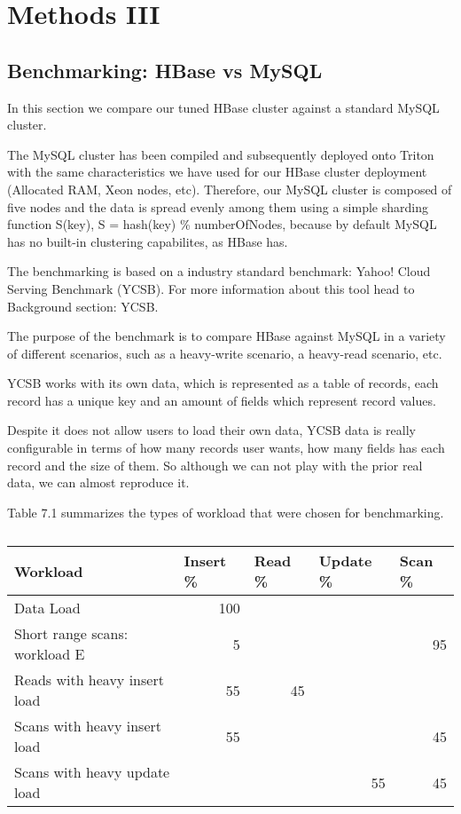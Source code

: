 \chapter{Methods III}
\label{chapter:methods III}
 
\section{Benchmarking: HBase vs MySQL}

In this section we compare our tuned HBase cluster against a standard MySQL cluster.
\par
The MySQL cluster has been compiled and subsequently deployed onto Triton with the same characteristics we have used for our HBase cluster deployment (Allocated RAM, Xeon nodes, etc). Therefore, our MySQL cluster is composed of five nodes and the data is spread evenly among them using a simple sharding function S(key), S = hash(key) \% numberOfNodes, because by default MySQL has no built-in clustering capabilites, as HBase has.

\bigskip

The benchmarking is based on a industry standard benchmark: Yahoo! Cloud Serving Benchmark (YCSB). For more information about this tool head to Background section: YCSB.
\par
The purpose of the benchmark is to compare HBase against MySQL in a variety of different scenarios, such as a heavy-write scenario, a heavy-read scenario, etc.
\par
YCSB works with its own data, which is represented as a table of records, each record has a unique key and an amount of fields which represent record values.
\par
Despite it does not allow users to load their own data, YCSB data is really configurable in terms of how many records user wants, how many fields has each record and the size of them. So although we can not play with the prior real data, we can almost reproduce it.

Table 7.1 summarizes the types of workload that were chosen for benchmarking.

\begin{table}[htbp]
\caption{}
\begin{tabular}{|l|r|l|l|l|}
\hline
Workload & \multicolumn{1}{l|}{ Insert \% } & Read \%  & Update \%  & Scan \% \\ \hline
Data Load  & 100 &  &  &  \\ \hline
Short range scans: workload E  & 5 &  &  & \multicolumn{1}{r|}{95} \\ \hline
Reads with heavy insert load  & 55 & \multicolumn{1}{r|}{45} &  &  \\ \hline
Scans with heavy insert load  & 55 &  &  & \multicolumn{1}{r|}{45} \\ \hline
Scans with heavy update load & \multicolumn{1}{l|}{} &  & \multicolumn{1}{r|}{55} & \multicolumn{1}{r|}{45} \\ \hline
\end{tabular}
\label{Table 1 YCSB Workloads.}
\end{table}

